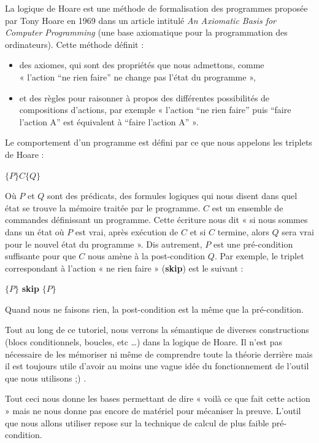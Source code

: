 \documentclass[12pt,francais,]{scrbook}
\providecommand{\tightlist}{%
  \setlength{\itemsep}{0pt}\setlength{\parskip}{0pt}}
\begin{document}
La logique de Hoare est une méthode de formalisation des programmes
proposée par Tony Hoare en 1969 dans un article intitulé \emph{An
Axiomatic Basis for Computer Programming} (une base axiomatique pour la
programmation des ordinateurs). Cette méthode définit :

\begin{itemize}
\tightlist
\item
  des axiomes, qui sont des propriétés que nous admettons, comme\\
  « l'action ``ne rien faire'' ne change pas l'état du programme »,
\item
  et des règles pour raisonner à propos des différentes possibilités de
  compositions d'actions, par exemple « l'action ``ne rien faire'' puis
  ``faire l'action A'' est équivalent à ``faire l'action A'' ».
\end{itemize}

Le comportement d'un programme est défini par ce que nous appelons les
triplets de Hoare :

\begin{center} \(\{P\} C \{Q\}\) \end{center}

Où \(P\) et \(Q\) sont des prédicats, des formules logiques qui nous
disent dans quel état se trouve la mémoire traitée par le programme.
\(C\) est un ensemble de commandes définissant un programme. Cette
écriture nous dit « si nous sommes dans un état où \(P\) est vrai, après
exécution de \(C\) et si \(C\) termine, alors \(Q\) sera vrai pour le
nouvel état du programme ». Dis autrement, \(P\) est une pré-condition
suffisante pour que \(C\) nous amène à la post-condition \(Q\). Par
exemple, le triplet correspondant à l'action « ne rien faire »
(\textbf{skip}) est le suivant :

\begin{center} \(\{P\}\) \textbf{skip} \(\{P\}\) \end{center}

Quand nous ne faisons rien, la post-condition est la même que la
pré-condition.

Tout au long de ce tutoriel, nous verrons la sémantique de diverses
constructions (blocs conditionnels, boucles, etc \ldots{}) dans la
logique de Hoare. Il n'est pas nécessaire de les mémoriser ni même de
comprendre toute la théorie derrière mais il est toujours utile d'avoir
au moins une vague idée du fonctionnement de l'outil que nous utilisons
;) .

Tout ceci nous donne les bases permettant de dire « voilà ce que fait
cette action » mais ne nous donne pas encore de matériel pour mécaniser
la preuve. L'outil que nous allons utiliser repose sur la technique de
calcul de plus faible pré-condition.
\end{document}
